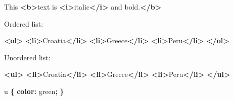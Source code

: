 \documentclass[]{memoir}
\newenvironment{Shaded}{}{}
\newcommand{\KeywordTok}[1]{\textcolor[rgb]{0.00,0.44,0.13}{\textbf{{#1}}}}
\newcommand{\DataTypeTok}[1]{\textcolor[rgb]{0.56,0.13,0.00}{{#1}}}
\newcommand{\NormalTok}[1]{{#1}}
\begin{document}
\begin{Shaded}
\begin{Highlighting}[]
\NormalTok{This }\KeywordTok{<b>}\NormalTok{text is }\KeywordTok{<i>}\NormalTok{italic}\KeywordTok{</i>} \NormalTok{and bold.}\KeywordTok{</b>}
\end{Highlighting}
\end{Shaded}


Ordered list:

\begin{Shaded}
\begin{Highlighting}[]
\KeywordTok{<ol>}
    \KeywordTok{<li>}\NormalTok{Croatia}\KeywordTok{</li>}
    \KeywordTok{<li>}\NormalTok{Greece}\KeywordTok{</li>}
    \KeywordTok{<li>}\NormalTok{Peru}\KeywordTok{</li>}
\KeywordTok{</ol>}
\end{Highlighting}
\end{Shaded}

Unordered list:

\begin{Shaded}
\begin{Highlighting}[]
\KeywordTok{<ul>}
    \KeywordTok{<li>}\NormalTok{Croatia}\KeywordTok{</li>}
    \KeywordTok{<li>}\NormalTok{Greece}\KeywordTok{</li>}
    \KeywordTok{<li>}\NormalTok{Peru}\KeywordTok{</li>}
\KeywordTok{</ul>}
\end{Highlighting}
\end{Shaded}


\begin{Shaded}
\begin{Highlighting}[]
\NormalTok{u }\KeywordTok{\{}
    \KeywordTok{color:} \DataTypeTok{green}\KeywordTok{;}
\KeywordTok{\}}
\end{Highlighting}
\end{Shaded}

\end{document}
